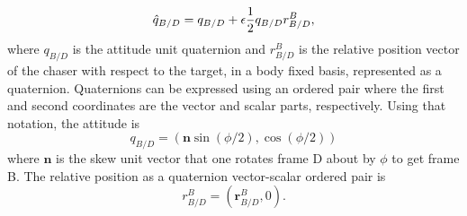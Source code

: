 \documentclass[letterpaper, preprint, paper,11pt]{AAS}	%
\begin{document}
\begin{equation}
\begin{aligned}
\label{eq:dual_quat_eg}
\hat{q}_{B/D} = q_{B/D} + \epsilon \frac{1}{2} q_{B/D} r^B_{B/D},
\end{aligned}\\
\end{equation}
where $q_{B/D}$ is the attitude unit quaternion and $r^B_{B/D}$ is the relative position vector of the chaser with respect to the target, in a body fixed basis, represented as a quaternion. Quaternions can be expressed using an ordered pair where the first and second coordinates are the vector and scalar parts, respectively. Using that notation, the attitude is
\begin{equation}
\label{eq:att_quat}
q_{B/D} = (\textbf{n}\sin{(\phi/2)} , \cos{(\phi/2)}) 
\end{equation}
where $\textbf{n}$ is the skew unit vector that one rotates frame D about by $\phi$ to get frame B. The relative position as a quaternion vector-scalar ordered pair is 
\begin{equation}
\label{eq:pos_quat}
r_{B/D}^B = (\textbf{r}_{B/D}^B, 0).
\end{equation}
\end{document}
